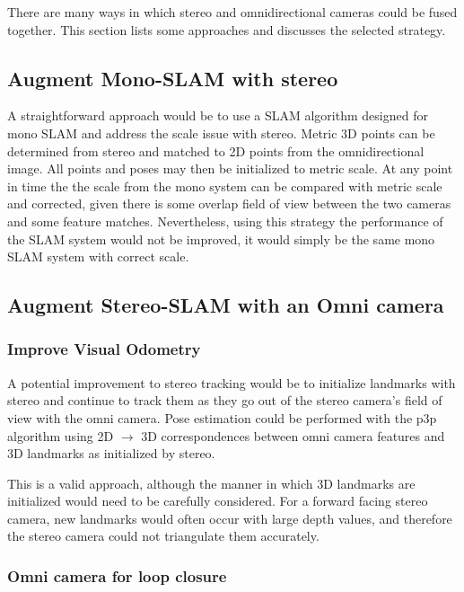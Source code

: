 There are many ways in which stereo and omnidirectional cameras could be fused together.  This section lists some approaches and discusses the selected strategy.

\subsection{Augment Mono-SLAM with stereo}

A straightforward approach would be to use a SLAM algorithm designed for mono SLAM and address the scale issue with stereo.  Metric 3D points can be determined from stereo and matched to 2D points from the omnidirectional image.  All points and poses may then be initialized to metric scale.  At any point in time the the scale from the mono system can be compared with metric scale and corrected, given there is some overlap field of view between the two cameras and some feature matches.  Nevertheless, using this strategy the performance of the SLAM system would not be improved, it would simply be the same mono SLAM system with correct scale.

\subsection{Augment Stereo-SLAM with an Omni camera}

\subsubsection{Improve Visual Odometry}

A potential improvement to stereo tracking would be to initialize landmarks with stereo and continue to track them as they go out of the stereo camera's field of view with the omni camera.  Pose estimation could be performed with the p3p algorithm using 2D $\rightarrow$ 3D correspondences between omni camera features and 3D landmarks as initialized by stereo.

This is a valid approach, although the manner in which 3D landmarks are initialized would need to be carefully considered.  For a forward facing stereo camera, new landmarks would often occur with large depth values, and therefore the stereo camera could not triangulate them accurately.

\subsubsection{Omni camera for loop closure}

